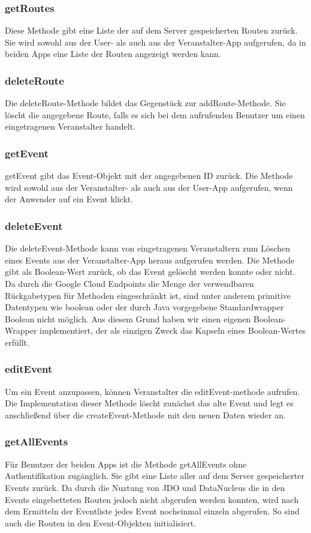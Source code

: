 \subsubsection*{getRoutes}
Diese Methode gibt eine Liste der auf dem Server gespeicherten Routen zurück. Sie wird sowohl aus der User- als auch aus der Veranstalter-App aufgerufen, da in beiden Apps eine Liste der Routen angezeigt werden kann.

\subsubsection*{deleteRoute}
Die deleteRoute-Methode bildet das Gegenstück zur addRoute-Methode. Sie löscht die angegebene Route, falls es sich bei dem aufrufenden Benutzer um einen eingetragenen Veranstalter handelt.

\subsubsection*{getEvent}
getEvent gibt das Event-Objekt mit der angegebenen ID zurück. Die Methode wird sowohl aus der Veranstalter- als auch aus der User-App aufgerufen, wenn der Anwender auf ein Event klickt.

\subsubsection*{deleteEvent}
Die deleteEvent-Methode kann von eingetragenen Veranstaltern zum Löschen eines Events aus der Veranstalter-App heraus aufgerufen werden. Die Methode gibt als Boolean-Wert zurück, ob das Event gelöscht werden konnte oder nicht. Da durch die Google Cloud Endpoints die Menge der verwendbaren Rückgabetypen für Methoden eingeschränkt ist, sind unter anderem primitive Datentypen wie boolean oder der durch Java vorgegebene Standardwrapper Boolean nicht möglich. Aus diesem Grund haben wir einen eigenen Boolean-Wrapper implementiert, der als einzigen Zweck das Kapseln eines Boolean-Wertes erfüllt.

\subsubsection*{editEvent}
Um ein Event anzupassen, können Veranstalter die editEvent-methode aufrufen. Die Implementation dieser Methode löscht zunächst das alte Event und legt es anschließend über die createEvent-Methode mit den neuen Daten wieder an.

\subsubsection*{getAllEvents}
Für Benutzer der beiden Apps ist die Methode getAllEvents ohne Authentifikation zugänglich. Sie gibt eine Liste aller auf dem Server gespeicherter Events zurück. Da durch die Nuztung von JDO und DataNucleus die in den Events eingebetteten Routen jedoch nicht abgerufen werden konnten, wird nach dem Ermitteln der Eventliste jedes Event nocheinmal einzeln abgerufen. So sind auch die Routen in den Event-Objekten initialisiert.

